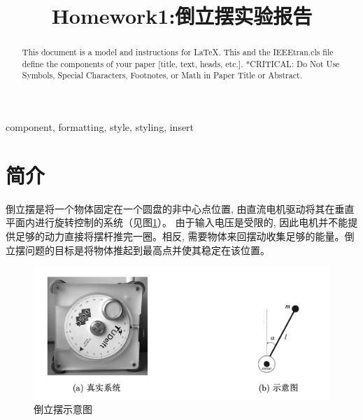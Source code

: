 \documentclass[conference,10pt]{IEEEtran}
\begin{document}
\title{Homework1:倒立摆实验报告\\}

\author{
}

\maketitle

\begin{abstract}
This document is a model and instructions for \LaTeX.
This and the IEEEtran.cls file define the components of your paper [title, text, heads, etc.]. *CRITICAL: Do Not Use Symbols, Special Characters, Footnotes, 
or Math in Paper Title or Abstract.
\end{abstract}

\begin{IEEEkeywords}
component, formatting, style, styling, insert
\end{IEEEkeywords}

\section{简介}
倒立摆是将一个物体固定在一个圆盘的非中心点位置, 由直流电机驱动将其在垂直平面内进行旋转控制的系统（见图\ref{pic1}）。 由于输入电压是受限的, 因此电机并不能提供足够的动力直接将摆杆推完一圈。相反, 需要物体来回摆动收集足够的能量。倒立摆问题的目标是将物体推起到最高点并使其稳定在该位置。

\begin{figure}[H]
    \centering
    \includegraphics[scale=0.25]{./figure/pic1.png}
    \caption{倒立摆示意图}
    \label{pic1}
\end{figure}
\end{document}
